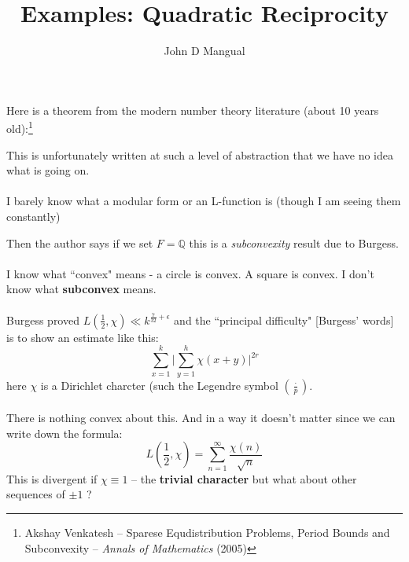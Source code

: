 \documentclass[12pt]{article}
\title{\textbf{ Examples:  Quadratic Reciprocity}}
\author{John D Mangual}
\date{}
\begin{document}
\selectfont \fontsize{25}{30}\selectfont

\maketitle

\noindent Here is a theorem from the modern number theory literature (about 10 years old):\footnote{Akshay Venkatesh -- Sparese Equdistribution Problems, Period Bounds and Subconvexity -- \textit{Annals of Mathematics} (2005)}

This is unfortunately written at such a level of abstraction that we have no idea what is going on.   \\ \\
I barely know what a modular form or an L-function is (though I am seeing them constantly)  \newpage

\noindent Then the author says if we set $F = \mathbb{Q}$ this is a \textit{subconvexity} result due to Burgess.  \\ \\
I know what ``convex" means - a circle is convex.  A square is convex.  I don't know what \textbf{subconvex} means. \\ \\
Burgess proved $L(\frac{1}{2}, \chi) \ll k^{\frac{7}{32}+\epsilon} $ and the ``principal difficulty" [Burgess' words] is to show an estimate like this:
$$ \sum_{x=1}^k \bigg| \sum_{y=1}^h \chi(x+y) \bigg|^{2r} $$
here $\chi$ is a Dirichlet charcter (such the Legendre symbol $(\frac{\cdot}{p})$. \\ \\
There is nothing convex about this. And in a way it doesn't matter since we can write down the formula:
$$ L( \frac{1}{2}, \chi) = \sum_{n = 1}^\infty \frac{\chi(n)}{\sqrt{n}} $$
This is divergent if $\chi \equiv 1$ -- the \textbf{trivial character} but what about other sequences of $\pm 1$ ?
\end{document}
